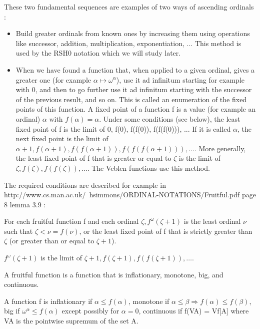 \documentclass[10pt]{article}
\begin{document}
These two fundamental sequences are examples of two ways of ascending ordinals :
\begin{itemize}
     \setlength{\itemsep}{1pt}
     \setlength{\parskip}{0pt}
     \setlength{\parsep}{0pt}
\item Build greater ordinals from known ones by increasing them using operations like successor, addition, multiplication, exponentiation, ... This method is used by the RSH0 notation which we will study later.

\item When we have found a function that, when applied to a given ordinal, gives a greater one (for example \( \alpha \mapsto \omega^\alpha \)), use it ad infinitum starting for example with 0, and then to go further use it ad infinitum starting with the successor of the previous result, and so on. This is called an enumeration of the fixed points of this function. A fixed point of a function f is a value (for example an ordinal) \( \alpha \) with \( f(\alpha) = \alpha \). Under some conditions (see below), the least fixed point of f is the limit of 0, f(0), f(f(0)), f(f(f(0))), ... If it is called \( \alpha \), the next fixed point is the limit of \( \alpha+1, f(\alpha+1), f(f(\alpha+1)), f(f(f(\alpha+1))), \ldots \).
More generally, the least fixed point of f that is greater or equal to \( \zeta \) is the limit of \( \zeta, f(\zeta), f(f(\zeta)), \ldots\).
The Veblen functions use this method.

\end{itemize}

The required conditions are described for example in http://www.cs.man.ac.uk/~hsimmons/ORDINAL-NOTATIONS/Fruitful.pdf page 8 lemma 3.9 : 

For each fruitful function f and each ordinal \( \zeta, f^\omega(\zeta+1) \) is the least ordinal \( \nu \) such that \( \zeta < \nu = f(\nu) \), or the least fixed point of f that is strictly greater than \( \zeta \) (or greater than or equal to \( \zeta+1 \)). 

\( f^\omega(\zeta+1) \) is the limit of \( \zeta+1, f(\zeta+1), f(f(\zeta+1)), \ldots \). 

A fruitful function is a function that is inflationary, monotone, big, and continuous.

A function f is inflationary if \( \alpha \leq f(\alpha) \), monotone if \( \alpha \leq \beta \Rightarrow f(\alpha) \leq f(\beta) \), big if \( \omega^\alpha \leq f(\alpha) \) except possibly for \( \alpha = 0 \), continuous if f(VA) = Vf[A] where VA is the pointwise supremum of the set A.
\end{document}
